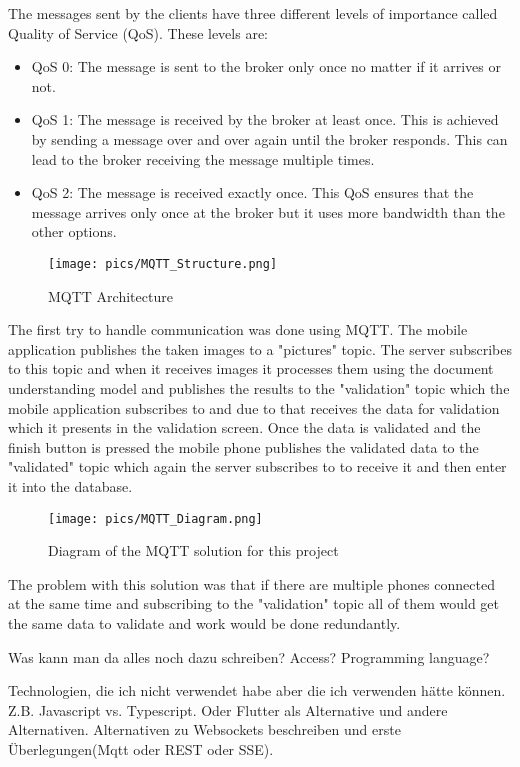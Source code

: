 The messages sent by the clients have three different levels of importance called Quality of Service (QoS).
These levels are:

\begin{itemize}
    \item QoS 0: The message is sent to the broker only once no matter if it arrives or not.
    \item QoS 1: The message is received by the broker at least once. This is achieved by sending a message over and over again until the broker responds. This can lead to the broker receiving the message multiple times.
    \item QoS 2: The message is received exactly once. This QoS ensures that the message arrives only once at the broker but it uses more bandwidth than the other options.
\end{itemize}


\FloatBarrier
\begin{figure}
    \centering
    \texttt{[image: pics/MQTT\_Structure.png]}
    \caption{MQTT Architecture}
    \label{fig:tech:MQTTStructure}
\end{figure}
\FloatBarrier

The first try to handle communication was done using MQTT. The mobile application publishes the taken images to a "pictures" topic. The server subscribes to this topic and when it receives images it processes them using the document understanding model and publishes the results to the "validation" topic which the mobile application subscribes to and due to that receives the data for validation which it presents in the validation screen. Once the data is validated and the finish button is pressed the mobile phone publishes the validated data to the "validated" topic which again the server subscribes to to receive it and then enter it into the database.

\FloatBarrier
\begin{figure}
    \centering
    \texttt{[image: pics/MQTT\_Diagram.png]}
    \caption{Diagram of the MQTT solution for this project}
    \label{fig:tech:MQTTDiagram}
\end{figure}
\FloatBarrier

The problem with this solution was that if there are multiple phones connected at the same time and subscribing to the "validation" topic all of them would get the same data to validate and work would be done redundantly.

Was kann man da alles noch dazu schreiben? Access? Programming language?

Technologien, die ich nicht verwendet habe aber die ich verwenden hätte können. Z.B. Javascript vs. Typescript. Oder Flutter als Alternative und andere Alternativen.
Alternativen zu Websockets beschreiben und erste Überlegungen(Mqtt oder REST oder SSE).